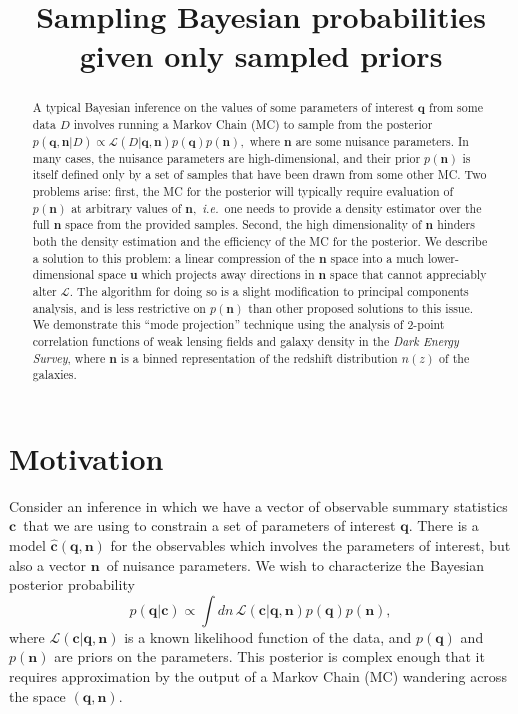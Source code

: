\documentclass[onecolumn]{aastex7}
\newcommand{\ie}{\textit{i.e.}}
\newcommand{\vecc}{\ensuremath{\mathbf{c}}}
\newcommand{\vecq}{\ensuremath{\mathbf{q}}}
\newcommand{\vecn}{\ensuremath{\mathbf{n}}}
\newcommand{\vecu}{\ensuremath{\mathbf{u}}}
\newcommand{\hatc}{\ensuremath{\hat{\mathbf{c}}}}
\newcommand{\likeli}{\mathcal{L}}
\begin{document}
\title{Sampling Bayesian probabilities given only sampled priors}




\begin{abstract}
	\vspace{0.2in}
A typical Bayesian inference on the values of some parameters of
interest $\vecq$ from some data $D$ involves running a Markov Chain (MC) to sample
from the posterior $p(\vecq,\vecn | D) \propto \likeli(D | \vecq,\vecn)
p(\vecq) p(\vecn),$ where $\vecn$ are some nuisance parameters.  In
many cases, the nuisance parameters are high-dimensional, and their
prior $p(\vecn)$ is itself defined only by a set of samples that have
been drawn from some other MC.  Two problems arise: first,
the MC for the posterior will typically require evaluation of
$p(\vecn)$ at arbitrary values of $\vecn,$ \ie\ one needs to provide a
density estimator over the full $\vecn$ space from the provided
samples.  Second, the high dimensionality of $\vecn$ hinders both the
density estimation and the efficiency of the MC for the posterior.  We
describe a solution to this problem: a linear compression of the
$\vecn$ space into a much lower-dimensional space $\vecu$ which
projects away directions in $\vecn$ space that cannot appreciably
alter $\likeli.$ The algorithm for doing so is a slight modification
to principal components analysis, and is less restrictive on
$p(\vecn)$ than other proposed solutions to this issue.
We demonstrate this ``mode projection'' technique using the analysis
of 2-point correlation functions of weak lensing fields and galaxy
density in the \textit{Dark Energy Survey}, where $\vecn$ is a binned representation of the redshift distribution
$n(z)$ of the galaxies.
\end{abstract}

\section{Motivation} \label{sec:intro}

Consider an inference in which we have a vector of observable summary
statistics \vecc\ that we are using to constrain a set of parameters of
interest \vecq.  There is a model $\hatc(\vecq,\vecn)$ for the
observables which involves the parameters of interest, but also a
vector \vecn\ of nuisance parameters.  
We wish to characterize the Bayesian posterior probability
\begin{equation}
  p(\vecq | \vecc) \propto \int dn\, \likeli(\vecc | \vecq, \vecn) p(\vecq) p(\vecn),
\label{eq:posterior}
\end{equation}
where $\likeli(\vecc | \vecq, \vecn)$ is a known likelihood function
of the data, and $p(\vecq)$ and $p(\vecn)$ are priors on the
parameters.  This posterior is complex enough that it requires
approximation by the output of a Markov Chain (MC) wandering across the space $(\vecq,\vecn).$
\end{document}
